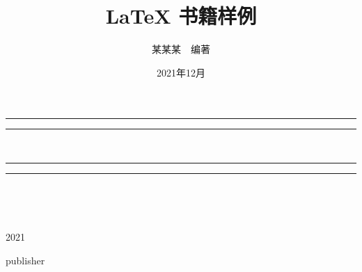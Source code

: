 \documentclass[UTF8,openany,twoside,12pt]{book}
\title{\bfseries LaTeX 书籍样例}
\author{\fangsong 某某某~~编著}
\date{\fangsong 2021年12月}
\theoremstyle{plain}
\newcommand{\plogo}{\fbox{$\mathcal{PL}$}}
\begin{document}


\begin{titlepage}
    \centering   %
    \scshape     %
    \vspace*{2\baselineskip}   %

	
    \rule{\textwidth}{1.6pt}\vspace*{-\baselineskip}\vspace*{2pt}  %
    \rule{\textwidth}{0.4pt}   %
	
    \vspace{0.75\baselineskip} %

    \makeatletter
    {\LARGE\bfseries \@title \\} %

	\vspace{0.75\baselineskip} %
	
	\rule{\textwidth}{0.4pt}\vspace*{-\baselineskip}\vspace{3.2pt} %
	\rule{\textwidth}{1.6pt}  %
	
	\vspace{2\baselineskip}   %
	
	
    {\fangsong\large \@author \\[10pt] }
	
    {\fangsong\large \@date \\}

    \makeatother


	
	\vfill %
	
	
	\plogo %
	
	\vspace{0.3\baselineskip} %
	
	2021 %

	{\large publisher} %
\end{titlepage}
\end{document}

